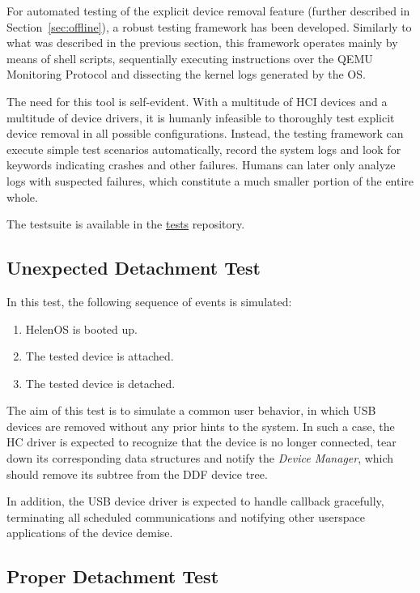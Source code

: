 For automated testing of the explicit device removal feature (further described
in Section~\ref{sec:offline}), a robust testing framework has been developed.
Similarly to what was described in the previous section, this framework operates
mainly by means of shell scripts, sequentially executing instructions over the
QEMU Monitoring Protocol and dissecting the kernel logs generated by the OS.

The need for this tool is self-evident. With a multitude of HCI devices and a
multitude of device drivers, it is humanly infeasible to thoroughly test
explicit device removal in all possible configurations. Instead, the testing
framework can execute simple test scenarios automatically, record the system
logs and look for keywords indicating crashes and other failures. Humans can
later only analyze logs with suspected failures, which constitute a much smaller
portion of the entire whole.

The testsuite is available in the \href{https://github.com/helenos-xhci-team/tests}{tests} repository.

\subsection{Unexpected Detachment Test}

In this test, the following sequence of events is simulated:
%
\begin{enumerate}
	\item HelenOS is booted up.
	\item The tested device is attached.
	\item The tested device is detached.
\end{enumerate}

The aim of this test is to simulate a common user behavior, in which USB devices
are removed without any prior hints to the system. In such a case, the HC driver
is expected to recognize that the device is no longer connected, tear down its
corresponding data structures and notify the \textit{Device Manager}, which
should remove its subtree from the DDF device tree.

In addition, the USB device driver is expected to handle 
callback gracefully, terminating all scheduled communications and notifying
other userspace applications of the device demise.


\subsection{Proper Detachment Test}

